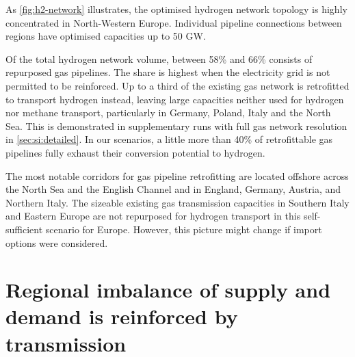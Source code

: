 
As \cref{fig:h2-network} illustrates, the optimised hydrogen network topology is
highly concentrated in North-Western Europe. Individual pipeline connections
between regions have optimised capacities up to 50 GW. %

Of the total hydrogen network volume, between 58\% and 66\% consists of
repurposed gas pipelines. The share is highest when the electricity grid is not
permitted to be reinforced. Up to a third of the existing gas network is
retrofitted to transport hydrogen instead, leaving large capacities neither used
for hydrogen nor methane transport, particularly in Germany, Poland, Italy and
the North Sea. This is demonstrated in supplementary runs with full gas network
resolution in \cref{sec:si:detailed}. In our scenarios, a little more than 40\%
of retrofittable gas pipelines fully exhaust their conversion potential to
hydrogen.

The most notable corridors for gas pipeline retrofitting are located offshore
across the North Sea and the English Channel and in England, Germany, Austria,
and Northern Italy. The sizeable existing gas transmission capacities in
Southern Italy and Eastern Europe are not repurposed for hydrogen transport in
this self-sufficient scenario for Europe. However, this picture might change if
import options were considered.



\section*{Regional imbalance of supply and demand is reinforced by transmission}
\label{sec:imbalance}

